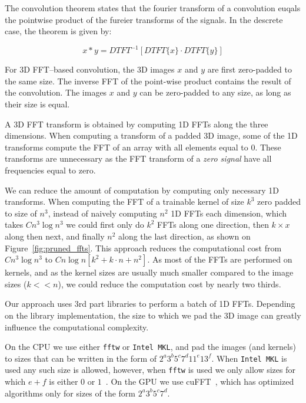 \documentclass[conference]{IEEEtran}
\begin{document}
  The convolution theorem states that the fourier transform of a
  convolution euqals the pointwise product of the fureier transforms
  of the signals.  In the descrete case, the theorem is given by:

  $$x \ast y = DTFT^{-1}[DTFT\{x\} \cdot DTFT\{y\}]$$

  For 3D FFT--based convolution, the 3D images $x$ and $y$ are first
  zero-padded to the same size.  The inverse FFT of the point-wise
  product contains the result of the convolution.  The images $x$ and
  $y$ can be zero-padded to any size, as long as their size is equal.

  A 3D FFT transform is obtained by computing 1D FFTs along the three
  dimensions.  When computing a transform of a padded 3D image, some
  of the 1D transforms compute the FFT of an array with all elements
  equal to $0$.  These transforms are unnecessary as the FFT transform
  of a \emph{zero signal} have all frequencies equal to zero.

  We can reduce the amount of computation by computing only necessary
  1D transforms.  When computing the FFT of a trainable kernel of size
  $k^3$ zero padded to size of $n^3$, instead of naively computing
  $n^2$ 1D FFTs each dimension, which takes $C n^3 \log n^3$ we could
  first only do $k^2$ FFTs along one direction, then $k \times x$
  along then next, and finally $n^2$ along the last direction, as
  shown on Figure~\ref{fig:pruned_ffts}.  This approach reduces the
  computational cost from $C n^3 \log n^3$ to $C n\log n[k^2 + k \cdot
    n + n^2]$.  As most of the FFTs are performed on kernels, and as
  the kernel sizes are usually much smaller compared to the image
  sizes ($k << n$), we could reduce the computation cost by nearly two
  thirds.

  Our approach uses $3$rd part libraries to perform a batch of 1D
  FFTs.  Depending on the library implementation, the size to which we
  pad the 3D image can greatly influence the computational complexity.

  On the CPU we use either {\tt fftw} or {\tt Intel MKL}, and pad the
  images (and kernels) to sizes that can be written in the form of
  $2^a3^b5^c7^d11^e13^f$.  When {\tt Intel MKL} is used any such size
  is allowed, however, when {\tt fftw} is used we only allow sizes for
  which $e+f$ is either $0$ or $1$~\cite{frigo1999fftw,frigo1998fftw}.
  On the GPU we use cuFFT~\cite{nvidia2010cufft}, which has optimized
  algorithms only for sizes of the form $2^a3^b5^c7^d$.
\end{document}
